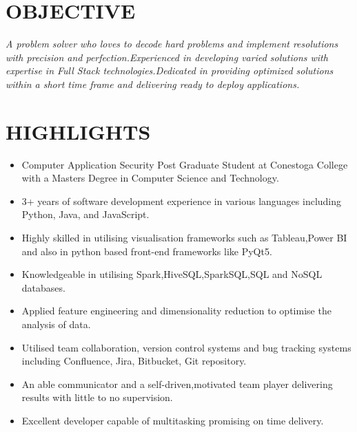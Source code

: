 \documentclass[margin]{res}
\begin{document}
\begin{resume}
\section{OBJECTIVE}
\textit{A problem solver who loves to decode hard problems and implement resolutions with precision and perfection.Experienced in developing varied solutions with expertise in Full Stack technologies.Dedicated in providing optimized solutions within a short time frame and delivering ready to deploy applications.}


\section{HIGHLIGHTS}
\begin{itemize}
\item Computer Application Security Post Graduate Student at Conestoga College with a Masters Degree in Computer Science and Technology.
\item 3+ years of software development experience in various languages including Python, Java, and JavaScript.
\item Highly skilled in utilising visualisation frameworks such as Tableau,Power BI and also in python based front-end frameworks like PyQt5.
\item Knowledgeable in utilising Spark,HiveSQL,SparkSQL,SQL and NoSQL databases.
\item Applied feature engineering and dimensionality reduction to optimise the analysis of data.
\item Utilised team collaboration, version control systems and bug tracking systems including Confluence, Jira, Bitbucket, Git repository.
\item An able communicator and a self-driven,motivated team player delivering results with little to no supervision.
\item Excellent developer capable of multitasking promising on time delivery.
\end{itemize}


\end{resume}
\end{document}
